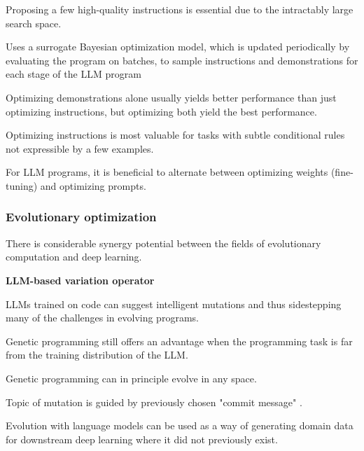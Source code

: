 Proposing a few high-quality instructions is essential due to the intractably large search space. \cite{opsahlong2024optimizinginstructionsdemonstrationsmultistage}

Uses a surrogate Bayesian optimization model, which is updated periodically by evaluating the program on batches, to sample instructions and demonstrations for each stage of the LLM program \cite{opsahlong2024optimizinginstructionsdemonstrationsmultistage}

Optimizing demonstrations alone usually yields better performance than just optimizing instructions, but optimizing both yield the best performance. \cite{opsahlong2024optimizinginstructionsdemonstrationsmultistage}

Optimizing instructions is most valuable for tasks with subtle conditional rules not expressible by a few examples.  \cite{opsahlong2024optimizinginstructionsdemonstrationsmultistage}

For LLM programs, it is beneficial to alternate between optimizing weights (fine-tuning) and optimizing prompts. \cite{soylu2024finetuningpromptoptimizationgreat}

\subsubsection{Evolutionary optimization}
There is considerable synergy potential between the fields of evolutionary computation and deep learning. \cite{lehman2022evolutionlargemodels}

\textbf{LLM-based variation operator}



LLMs trained on code can suggest intelligent mutations and thus sidestepping many of the challenges in evolving programs. \cite{lehman2022evolutionlargemodels}

Genetic programming still offers an advantage when the programming task is far from the training distribution of the LLM. \cite{lehman2022evolutionlargemodels}

Genetic programming can in principle evolve in any space. \cite{lehman2022evolutionlargemodels}

Topic of mutation is guided by previously chosen "commit message" . \cite{lehman2022evolutionlargemodels}

Evolution with language models can be used as a way of generating domain data for downstream deep learning where it did not previously exist. \cite{lehman2022evolutionlargemodels}


